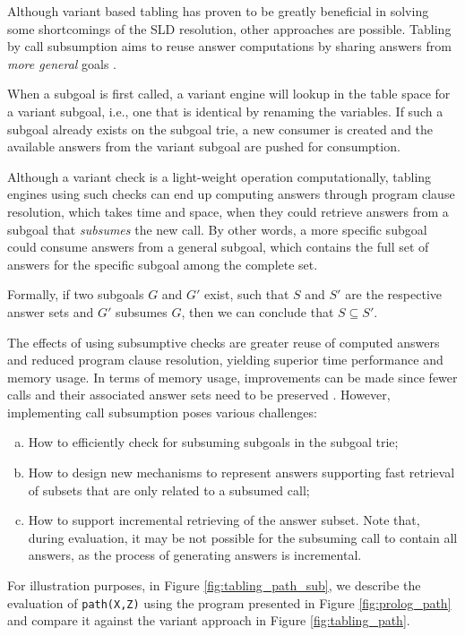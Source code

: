 Although variant based tabling has proven to be greatly beneficial in solving some shortcomings of the SLD resolution,
other approaches are possible. Tabling by call subsumption aims to reuse answer computations by sharing answers from
\textit{more general} goals \cite{Johnson-99}.

When a subgoal is first called, a variant engine will lookup in the table space for a variant subgoal, i.e.,
one that is identical by renaming the variables. If such a subgoal already exists on the subgoal trie, a new
consumer is created and the available answers from the variant subgoal are pushed for consumption.

Although a variant check is a light-weight operation computationally,
tabling engines using such checks can end up computing answers through program clause resolution, which takes time and space,
when they could retrieve answers from a subgoal that \textit{subsumes} the new call. By other words, a more specific subgoal
could consume answers from a general subgoal, which contains the full set of answers for the specific subgoal among the complete set.

Formally, if two subgoals $G$ and $G'$ exist, such that $S$ and $S'$ are the respective answer sets and
$G'$ subsumes $G$, then we can conclude that $S \subseteq S'$.

The effects of using subsumptive checks are greater reuse of computed answers and reduced program clause resolution, yielding
superior time performance and memory usage. In terms of memory usage, improvements can be made since fewer calls and their
associated answer sets need to be preserved \cite{Johnson-99}. However, implementing call subsumption poses various challenges:

\begin{enumerate}[(a)]
\item How to efficiently check for subsuming subgoals in the subgoal trie;
\item How to design new mechanisms to represent answers supporting fast retrieval of subsets that are only related to a subsumed call;
\item How to support incremental retrieving of the answer subset. Note that, during evaluation, it may be not possible for
the subsuming call to contain all answers, as the process of generating answers is incremental.
\end{enumerate}

For illustration purposes, in Figure \ref{fig:tabling_path_sub}, we describe the evaluation of \texttt{path(X,Z)}
using the program presented in Figure \ref{fig:prolog_path}
and compare it against the variant approach in Figure \ref{fig:tabling_path}.

